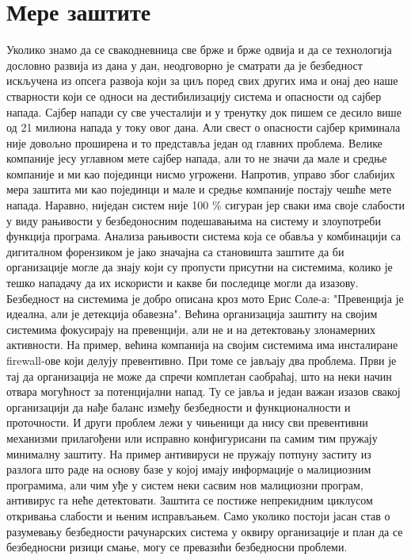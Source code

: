 \documentclass[a4paper]{article}
\begin{document}
	\section{Мере заштите}
	\label{sec:MereZastite}
	Уколико знамо да се свакодневница све брже и брже одвија и да се технологија дословно развија из дана у дан, неодговорно је сматрати да је безбедност искључена из опсега развоја који за циљ поред свих других има и онај део наше стварности који се односи на дестибилизацију система и опасности од сајбер напада\cite{semZastita}. Сајбер напади су све учесталији и у тренутку док пишем се десило више од 21 милиона напада у току овог дана\cite{brojNapada}. Али свест о опасности сајбер крими\-нала није довољно проширена и то представља један од главних пробле\-ма. Велике компаније јесу углавном мете сајбер напада, али то не значи да мале и средње компаније и ми као појединци нисмо угрожени. Напротив, управо због слабијих мера заштита ми као појединци и мале и средње компаније постају чешће мете напада. \newline
   	Наравно, ниједан систем није 100 \% сигуран јер сваки има своје слабо\-сти у виду рањивости у безбедоносним подешавањима на систему и
	злоупо\-треби функција програма. Анализа рањивости система која се обавља у комбинацији са дигиталном форензиком је јако значајна са
	станови\-шта заштите  да би организације могле да знају који су 
	пропусти присутни на системима, колико је тешко нападачу да их искористи и какве би последице могли да изазову. Безбедност на систе\-мима је добро описана кроз мото Ерис Соле-а: "Превенција је идеална, али је детекција обавезна"\cite{EricCole}. Већина организација заштиту на својим системима фокусира\-ју на превенцији, али не и на детектовању злона\-мерних активности. На пример, већина компанија на својим системима има инсталиране firewall-ове који делују превентивно. При томе се јављају два проблема. Први је тај да организација не може да спречи комплетан саобраћај, што на неки начин отвара могућност за потенци\-јални напад. Ту се јавља и један важан изазов свакој организацији да нађе баланс између безбедности и функционалности и проточности. И други проблем лежи у чињеници да нису сви превентивни механизми прилагођени или исправно конфигурисани па самим тим пружају мини\-малну заштиту. На пример антивируси не пружају потпуну заститу из разлога што раде на основу базе у којој имају информације о малициозним програми\-ма, али чим уђе у систем неки сасвим нов малициозни програм, антивирус га неће детектовати. Заштита се пости\-же непрекидним циклусом откривања слабости и њеним исправљањем. Само уколико постоји јасан став о разумевању безбедности рачунар\-ских система у оквиру организације и план да се безбедносни ризици смање, могу се превазићи безбедносни проблеми. 
\end{document}
